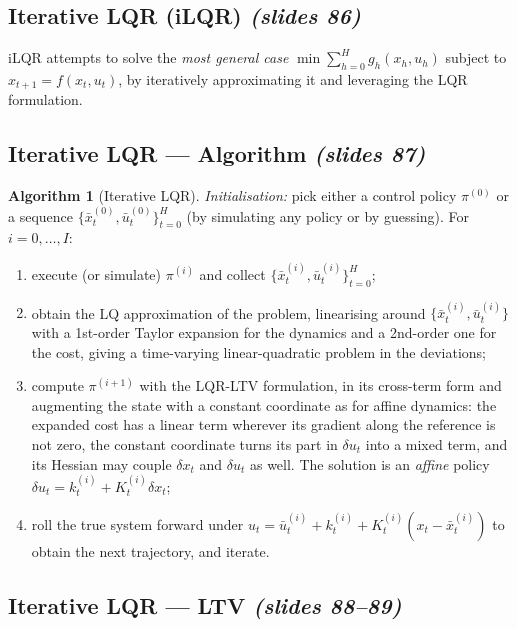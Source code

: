\documentclass[11pt,a4paper]{article}
\newcommand{\slides}[1]{\emph{(slides #1)}}
\theoremstyle{plain}
\theoremstyle{definition}
\newtheorem{algorithm}[theorem]{Algorithm}
\theoremstyle{remark}
\begin{document}
\subsection{Iterative LQR (iLQR) \slides{86}}

iLQR attempts to solve the \emph{most general case} $\min\sum_{h=0}^{H}g_h(x_h,u_h)$ subject to $x_{t+1}=f(x_t,u_t)$, by iteratively approximating it and leveraging the LQR formulation.

\subsection{Iterative LQR --- Algorithm \slides{87}}

\begin{algorithm}[Iterative LQR]\label{alg:ilqr}
\emph{Initialisation:} pick either a control policy $\pi^{(0)}$ or a sequence $\{\bar x^{(0)}_t,\bar u^{(0)}_t\}_{t=0}^H$ (by simulating any policy or by guessing). For $i=0,\dots,I$:
\begin{enumerate}[nosep]
  \item execute (or simulate) $\pi^{(i)}$ and collect $\{\bar x^{(i)}_t,\bar u^{(i)}_t\}_{t=0}^H$;
  \item obtain the LQ approximation of the problem, linearising around $\{\bar x^{(i)}_t,\bar u^{(i)}_t\}$ with a 1st-order Taylor expansion for the dynamics and a 2nd-order one for the cost, giving a time-varying linear-quadratic problem in the deviations;
  \item compute $\pi^{(i+1)}$ with the LQR-LTV formulation, in its cross-term form and augmenting the state with a constant coordinate as for affine dynamics: the expanded cost has a linear term wherever its gradient along the reference is not zero, the constant coordinate turns its part in $\delta u_t$ into a mixed term, and its Hessian may couple $\delta x_t$ and $\delta u_t$ as well. The solution is an \emph{affine} policy $\delta u_t=k^{(i)}_t+K^{(i)}_t\delta x_t$;
  \item roll the true system forward under $u_t=\bar u^{(i)}_t+k^{(i)}_t+K^{(i)}_t(x_t-\bar x^{(i)}_t)$ to obtain the next trajectory, and iterate.
\end{enumerate}
\end{algorithm}

\subsection{Iterative LQR --- LTV \slides{88--89}}
\end{document}
